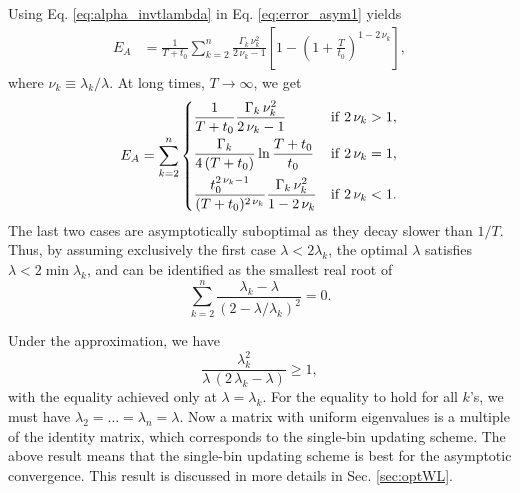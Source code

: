 \documentclass[reprint, floatfix]{revtex4-1}
\newcommand{\Err}{E}
\begin{document}
Using Eq. \eqref{eq:alpha_invtlambda}
in Eq. \eqref{eq:error_asym1} yields
%
\begin{align}
\Err_A
&=
\frac{    1    }
     { T + t_0 }
\sum_{k = 2}^n
  \frac{ \Gamma_k \, \nu_k^2 }
       {    2 \, \nu_k - 1   }
\left[
  1 - \left(
        1 + \frac{ T }{ t_0 }
      \right)^{1 - 2 \, \nu_k}
\right],
\label{eq:error_asym_invt}
\end{align}
%
where $\nu_k \equiv \lambda_k / \lambda$.
%
At long times, $T \to \infty$, we get
$$
\begin{aligned}
  \Err_A
  =
  \sum_{k = 2}^n
  \begin{dcases}
    \frac{    1    }
         { T + t_0 }
    \frac{ \Gamma_k \, \nu_k^2 }
         {   2 \, \nu_k - 1    }
    &
    \mathrm{if \;} 2 \, \nu_k > 1,
    \\%
    \frac{    \Gamma_k    }
         { 4 \, (T + t_0) }
    \ln \frac{ T + t_0 }
             {   t_0   }
    &
    \mathrm{if \;} 2 \, \nu_k = 1,
    \\
    \frac{  t_0^{ 2 \, \nu_k  - 1}  }
         { (T + t_0)^{ 2 \, \nu_k } }
    \frac{ \Gamma_k \, \nu_k^2 }
         {   1 - 2 \, \nu_k    }
    &
    \mathrm{if \;} 2 \, \nu_k < 1.
  \end{dcases}
\end{aligned}
$$
%
The last two cases
are asymptotically suboptimal
as they decay slower than $1/T$.
%
Thus, by assuming exclusively the first case
$\lambda < 2 \lambda_k$,
the optimal $\lambda$
satisfies $\lambda < 2 \min \lambda_k$,
and can be identified as
the smallest real root of
%
\begin{equation}
\sum_{k = 2}^n
\frac{ \lambda_k - \lambda }
{ \left(2 - \lambda/ \lambda_k \right)^2 }
= 0.
\label{eq:optimal_lambda_approx}
\end{equation}



Under the approximation, we have
$$
\frac{ \lambda_k^2 }
     { \lambda \, (2 \, \lambda_k - \lambda) }
\ge 1,
$$
with the equality achieved only at $\lambda = \lambda_k$.
For the equality to hold for all $k$'s,
we must have
$\lambda_2 = \dots = \lambda_n = \lambda$.
%
Now a matrix with uniform eigenvalues
is a multiple of the identity matrix,
which corresponds to the single-bin updating scheme.
%
The above result means that
the single-bin updating scheme is best
for the asymptotic convergence.
%
This result is discussed in more details in
Sec. \ref{sec:optWL}.
\end{document}
